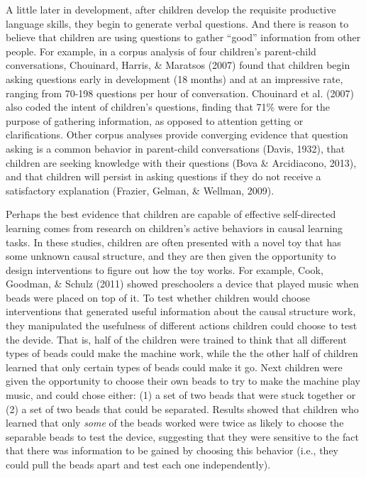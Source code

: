 \documentclass[a4paper,man,apacite,floatsintext]{apa6}
\begin{document}
A little later in development, after children develop the requisite
productive language skills, they begin to generate verbal questions. And
there is reason to believe that children are using questions to gather
``good'' information from other people. For example, in a corpus
analysis of four children's parent-child conversations, Chouinard,
Harris, \& Maratsos (2007) found that children begin asking questions
early in development (18 months) and at an impressive rate, ranging from
70-198 questions per hour of conversation. Chouinard et al. (2007) also
coded the intent of children's questions, finding that 71\% were for the
purpose of gathering information, as opposed to attention getting or
clarifications. Other corpus analyses provide converging evidence that
question asking is a common behavior in parent-child conversations
(Davis, 1932), that children are seeking knowledge with their questions
(Bova \& Arcidiacono, 2013), and that children will persist in asking
questions if they do not receive a satisfactory explanation (Frazier,
Gelman, \& Wellman, 2009).

Perhaps the best evidence that children are capable of effective
self-directed learning comes from research on children's active
behaviors in causal learning tasks. In these studies, children are often
presented with a novel toy that has some unknown causal structure, and
they are then given the opportunity to design interventions to figure
out how the toy works. For example, Cook, Goodman, \& Schulz (2011)
showed preschoolers a device that played music when beads were placed on
top of it. To test whether children would choose interventions that
generated useful information about the causal structure work, they
manipulated the usefulness of different actions children could choose to
test the devide. That is, half of the children were trained to think
that all different types of beads could make the machine work, while the
the other half of children learned that only certain types of beads
could make it go. Next children were given the opportunity to choose
their own beads to try to make the machine play music, and could chose
either: (1) a set of two beads that were stuck together or (2) a set of
two beads that could be separated. Results showed that children who
learned that only \emph{some} of the beads worked were twice as likely
to choose the separable beads to test the device, suggesting that they
were sensitive to the fact that there was information to be gained by
choosing this behavior (i.e., they could pull the beads apart and test
each one independently).
\end{document}
